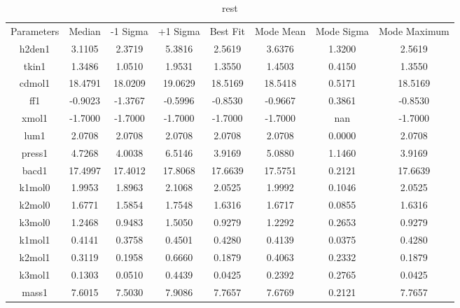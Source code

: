 \begin{table}
\caption{rest}
\begin{tabular}{cccccccc}
Parameters & Median & -1 Sigma & +1 Sigma & Best Fit & Mode Mean & Mode Sigma & Mode Maximum \\
h2den1 & 3.1105 & 2.3719 & 5.3816 & 2.5619 & 3.6376 & 1.3200 & 2.5619 \\
tkin1 & 1.3486 & 1.0510 & 1.9531 & 1.3550 & 1.4503 & 0.4150 & 1.3550 \\
cdmol1 & 18.4791 & 18.0209 & 19.0629 & 18.5169 & 18.5418 & 0.5171 & 18.5169 \\
ff1 & -0.9023 & -1.3767 & -0.5996 & -0.8530 & -0.9667 & 0.3861 & -0.8530 \\
xmol1 & -1.7000 & -1.7000 & -1.7000 & -1.7000 & -1.7000 & nan & -1.7000 \\
lum1 & 2.0708 & 2.0708 & 2.0708 & 2.0708 & 2.0708 & 0.0000 & 2.0708 \\
press1 & 4.7268 & 4.0038 & 6.5146 & 3.9169 & 5.0880 & 1.1460 & 3.9169 \\
bacd1 & 17.4997 & 17.4012 & 17.8068 & 17.6639 & 17.5751 & 0.2121 & 17.6639 \\
k1mol0 & 1.9953 & 1.8963 & 2.1068 & 2.0525 & 1.9992 & 0.1046 & 2.0525 \\
k2mol0 & 1.6771 & 1.5854 & 1.7548 & 1.6316 & 1.6717 & 0.0855 & 1.6316 \\
k3mol0 & 1.2468 & 0.9483 & 1.5050 & 0.9279 & 1.2292 & 0.2653 & 0.9279 \\
k1mol1 & 0.4141 & 0.3758 & 0.4501 & 0.4280 & 0.4139 & 0.0375 & 0.4280 \\
k2mol1 & 0.3119 & 0.1958 & 0.6660 & 0.1879 & 0.4063 & 0.2332 & 0.1879 \\
k3mol1 & 0.1303 & 0.0510 & 0.4439 & 0.0425 & 0.2392 & 0.2765 & 0.0425 \\
mass1 & 7.6015 & 7.5030 & 7.9086 & 7.7657 & 7.6769 & 0.2121 & 7.7657 \\
\end{tabular}
\end{table}
